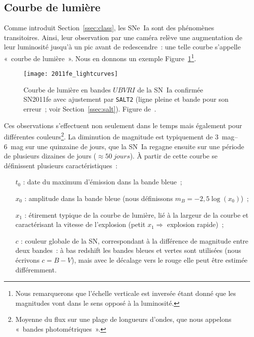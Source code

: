 \documentclass[../main/main.tex]{subfiles}
\begin{document}
\subsection{Courbe de lumière}\label{ssec:lc}

Comme introduit Section~\ref{ssec:class}, les SNe~Ia sont des phénomènes
transitoires. Ainsi, leur observation par une caméra relève une augmentation de
leur luminosité jusqu'à un pic avant de redescendre~: une telle courbe s'appelle
«~courbe de lumière~». Nous en donnons un exemple
Figure~\ref{fig:2011fe_phot}\footnote{Nous remarquerons que l'échelle verticale
    est inversée étant donné que les magnitudes vont dans le sens opposé à la
luminosité.}.

\begin{figure}[]
    \centering
    \texttt{[image: 2011fe\_lightcurves]}
    \caption[Courbe de lumière de la SN~Ia SN2011fe]{Courbe de lumière en bandes
        $UBVRI$ de la SN~Ia confirmée SN2011fe avec ajustement par
        \texttt{SALT2} (ligne pleine et bande pour son erreur~;
        voir Section~\ref{ssec:salt}). Figure
    de~\cite{pereira2013}.}\label{fig:2011fe_phot}
\end{figure}

Ces observations s'effectuent non seulement dans le temps mais également pour
différentes couleurs\footnote{Moyenne du flux sur une plage de longueurs
d'ondes, que nous appelons «~bandes photométriques~».}. La diminution de magnitude
est typiquement de \SIrange{3}{6}{mag} sur une quinzaine de jours, que la SN~Ia
regagne ensuite sur une période de plusieurs dizaines de jours ($\approx
\SI{50}{jours}$). À partir de cette courbe se définissent plusieurs
caractéristiques~:

\begin{itemize}
    \item[$t_0$]: date du maximum d'émission dans la bande bleue~;
    \item[$x_0$]: amplitude dans la bande bleue (nous définissons $m_B =
        -2,5\log(x_0)$)~;
    \item[$x_1$]: étirement typique de la courbe de lumière, lié à la largeur de
        la courbe et caractérisant la vitesse de l'explosion (petit $x_1
        \Rightarrow$ explosion rapide)~;
    \item[$c$]: couleur globale de la SN, correspondant à la différence de
        magnitude entre deux bandes~: à bas redshift les bandes bleues
        et vertes sont utilisées (nous écrivons $c = B - V$), mais avec le
        décalage vers le rouge elle peut être estimée différemment.
\end{itemize}
\end{document}
